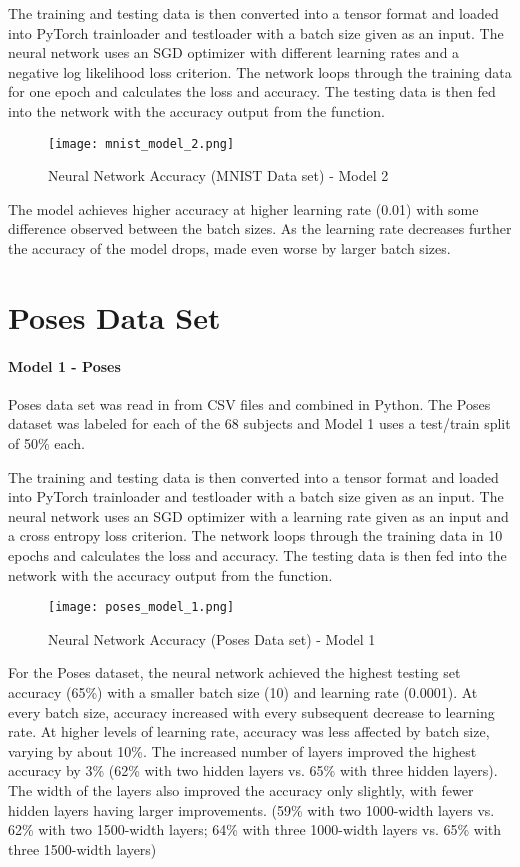 \documentclass[12pt]{article}
\begin{document}
The training and testing data is then converted into a tensor format and loaded into PyTorch trainloader and testloader with a batch size given as an input. The neural network uses an SGD optimizer with different learning rates and a negative log likelihood loss criterion. The network loops through the training data for one epoch and calculates the loss and accuracy. The testing data is then fed into the network with the accuracy output from the function.

\begin{figure}[H]
	\texttt{[image: mnist\_model\_2.png]}
	\caption{Neural Network Accuracy (MNIST Data set) - Model 2}
\end{figure}

The model achieves higher accuracy at higher learning rate (0.01) with some difference observed between the batch sizes. As the learning rate decreases further the accuracy of the model drops, made even worse by larger batch sizes.

\section{Poses Data Set}

\paragraph{Model 1 - Poses}

Poses data set was read in from CSV files and combined in Python. The Poses dataset was labeled for each of the 68 subjects and  Model 1 uses a test/train split of 50\% each.

The training and testing data is then converted into a tensor format and loaded into PyTorch trainloader and testloader with a batch size given as an input.  The neural network uses an SGD optimizer with a learning rate given as an input and a cross entropy loss criterion. The network loops through the training data in 10 epochs and calculates the loss and accuracy. The testing data is then fed into the network with the accuracy output from the function.

\begin{figure}[H]
	\texttt{[image: poses\_model\_1.png]}
	\caption{Neural Network Accuracy (Poses Data set) - Model 1}
\end{figure}

For the Poses dataset, the neural network achieved the highest testing set accuracy (65\%) with a smaller batch size (10) and learning rate (0.0001). At every batch size, accuracy increased with every subsequent decrease to learning rate. At higher levels of learning rate, accuracy was less affected by batch size, varying by about 10\%. The increased number of layers improved the highest accuracy by 3\% (62\% with two hidden layers vs. 65\% with three hidden layers). The width of the layers also improved the accuracy only slightly, with fewer hidden layers having larger improvements. (59\% with two 1000-width layers vs. 62\% with two 1500-width layers; 64\% with three 1000-width layers vs. 65\% with three 1500-width layers)
\end{document}
